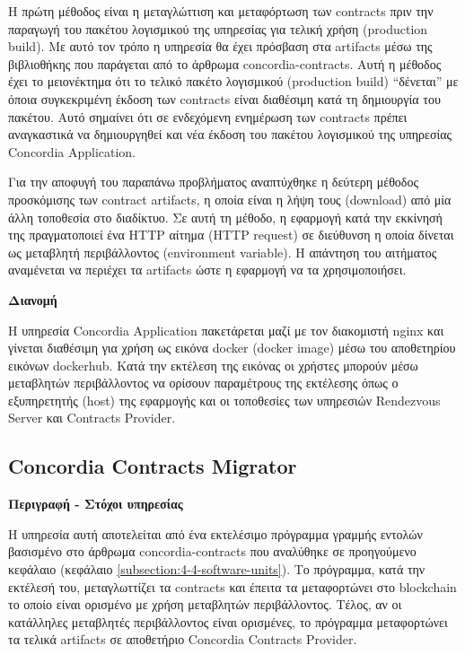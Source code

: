 Η πρώτη μέθοδος είναι η μεταγλώττιση και μεταφόρτωση των contracts πριν την παραγωγή του πακέτου λογισμικού της υπηρεσίας για τελική χρήση (production build). Με αυτό τον τρόπο η υπηρεσία θα έχει πρόσβαση στα artifacts μέσω της βιβλιοθήκης που παράγεται από το άρθρωμα concordia-contracts. Αυτή η μέθοδος έχει το μειονέκτημα ότι το τελικό πακέτο λογισμικού (production build) ``δένεται'' με όποια συγκεκριμένη έκδοση των contracts είναι διαθέσιμη κατά τη δημιουργία του πακέτου. Αυτό σημαίνει ότι σε ενδεχόμενη ενημέρωση των contracts πρέπει αναγκαστικά να δημιουργηθεί και νέα έκδοση του πακέτου λογισμικού της υπηρεσίας Concordia Application.

Για την αποφυγή του παραπάνω προβλήματος αναπτύχθηκε η δεύτερη μέθοδος προσκόμισης των contract artifacts, η οποία είναι η λήψη τους (download) από μία άλλη τοποθεσία στο διαδίκτυο. Σε αυτή τη μέθοδο, η εφαρμογή κατά την εκκίνησή της πραγματοποιεί ένα HTTP αίτημα (HTTP request) σε διεύθυνση η οποία δίνεται ως μεταβλητή περιβάλλοντος (environment variable). Η απάντηση του αιτήματος αναμένεται να περιέχει τα artifacts ώστε η εφαρμογή να τα χρησιμοποιήσει.

\vspace{0.5cm}
\textbf{Διανομή}

Η υπηρεσία Concordia Application πακετάρεται μαζί με τον διακομιστή nginx και γίνεται διαθέσιμη για χρήση ως εικόνα docker (docker image) μέσω του αποθετηρίου εικόνων dockerhub. Κατά την εκτέλεση της εικόνας οι χρήστες μπορούν μέσω μεταβλητών περιβάλλοντος να ορίσουν παραμέτρους της εκτέλεσης όπως ο εξυπηρετητής (host) της εφαρμογής και οι τοποθεσίες των υπηρεσιών Rendezvous Server και Contracts Provider.

\subsection{Concordia Contracts Migrator} \label{subsection:4-4-concordia-contracts-migrator}

\vspace{0.5cm}
\textbf{Περιγραφή - Στόχοι υπηρεσίας}

Η υπηρεσία αυτή αποτελείται από ένα εκτελέσιμο πρόγραμμα γραμμής εντολών βασισμένο στο άρθρωμα concordia-contracts που αναλύθηκε σε προηγούμενο κεφάλαιο (κεφάλαιο \ref{subsection:4-4-software-units}). Το πρόγραμμα, κατά την εκτέλεσή του, μεταγλωττίζει τα contracts και έπειτα τα μεταφορτώνει στο blockchain το οποίο είναι ορισμένο με χρήση μεταβλητών περιβάλλοντος. Τέλος, αν οι κατάλληλες μεταβλητές περιβάλλοντος είναι ορισμένες, το πρόγραμμα μεταφορτώνει τα τελικά artifacts σε αποθετήριο Concordia Contracts Provider.

